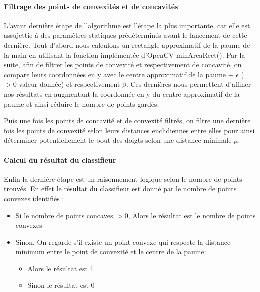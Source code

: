 \paragraph{Filtrage des points de convexités et de concavités}
L’avant dernière étape de l’algorithme est l’étape la plus importante, car elle est assujettie à des paramètres statiques prédéterminés avant le lancement de cette dernière. 
Tout d’abord nous calculons un rectangle approximatif de la paume de la main en utilisant la fonction implémentée d’OpenCV minAreaRect().
Par la suite, afin de filtrer les points de convexité et respectivement de concavité, on compare leurs coordonnées en y avec le centre approximatif de la paume + $\epsilon$ ($>0$ valeur donnée) et respectivement $\beta$. Ces dernières nous permettent d’affiner nos résultats en augmentant la coordonnée en y du centre approximatif de la paume et ainsi réduire le nombre de points gardés.

Puis une fois les points de concavité et de convexité filtrés, on filtre une dernière fois les points de convexité selon leurs distances euclidiennes entre elles pour ainsi déterminer potentiellement le bout des doigts selon une distance minimale $\mu$.

\paragraph{Calcul du résultat du classifieur}
Enfin la dernière étape est un raisonnement logique selon le nombre de points trouvés. En effet le résultat du classifieur est donné par le nombre de points convexes identifiés :

\begin{itemize}
\item Si le nombre de points concaves $> 0$, Alors le résultat est le nombre de points convexes
\item Sinon, On regarde s’il existe un point convexe qui respecte la distance minimum entre le point de convexité et le centre de la paume:
\begin{itemize}
\item Alors le résultat est 1
\item Sinon le résultat est 0
\end{itemize}
\end{itemize}

